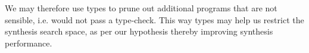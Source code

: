 \documentclass{article}
\begin{document}


We may therefore use types to prune out additional programs
that are not sensible, i.e. would not pass a type-check.
This way types may help us restrict the synthesis search space,
as per our hypothesis thereby improving synthesis performance.




\end{document}
